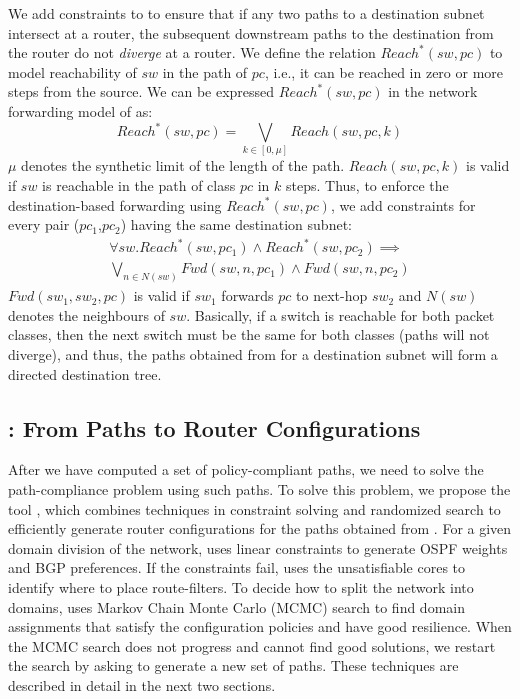 We add constraints to \genesis to ensure that
if any two paths to a destination subnet intersect at a router,
the subsequent downstream paths to the destination from the
router do not \emph{diverge} at a router.  
We define the relation $Reach^*(sw,pc)$ to model reachability 
of $sw$ in the path of $pc$, i.e., it can be reached in zero or more
steps from the source. We can be expressed $Reach^*(sw,pc)$ 
in the network forwarding model of \genesis as:
\begin{equation}
	Reach^*(sw,pc) = \bigvee_{k \in [0, \mu]} Reach(sw, pc, k)
\end{equation}
$\mu$ denotes the synthetic limit of the length of the path. 
$Reach(sw, pc, k)$ is valid if $sw$ is reachable in the path of
class $pc$ in $k$ steps. Thus, to enforce the destination-based
forwarding using $Reach^*(sw,pc)$, we add
constraints for every pair ($pc_1$,$pc_2$) having the same 
 destination subnet:
 \begin{multline}
 \forall sw. Reach^*(sw, pc_1) \wedge Reach^*(sw, pc_2) \implies \\ \bigvee_{n \in N(sw)} Fwd(sw, n, pc_1) \wedge Fwd(sw, n, pc_2)
 \end{multline}
 $Fwd(sw_1, sw_2,pc)$ is valid if $sw_1$ forwards $pc$ to next-hop $sw_2$ and
 $N(sw)$ denotes the neighbours of $sw$. Basically, 
 if a switch is reachable for both packet classes, 
 then the next switch must be the same for both classes
 (paths will not diverge), and thus, the paths obtained
 from \genesis for a destination subnet will form a 
 directed destination tree. 

\subsection{\name: From Paths to Router Configurations} 
After we have computed a set of policy-compliant paths,
we need to solve the path-compliance problem using such paths.
To solve this problem, we propose the tool \name, which
combines techniques in constraint solving and randomized search
to efficiently generate router configurations for the paths obtained from \genesis.
For a given domain division of the network,
\name uses linear constraints to generate OSPF weights and BGP preferences.
If the constraints fail, \name uses the unsatisfiable cores to
identify where to place route-filters.
To decide how to split the network into domains,
\name uses Markov Chain Monte Carlo (MCMC) search to find
domain assignments that satisfy the configuration policies and have good resilience.
When the MCMC search does not progress and cannot find good solutions,
we restart the search by asking \genesis to generate a new set of paths.
These techniques are described in detail in the next two sections.
